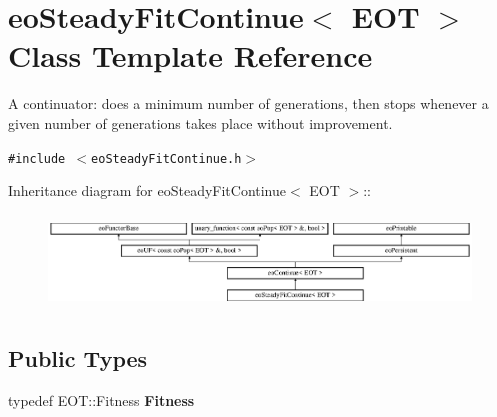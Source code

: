 \section{eo\-Steady\-Fit\-Continue$<$ EOT $>$ Class Template Reference}
\label{classeo_steady_fit_continue}
A continuator: does a minimum number of generations, then stops whenever a given number of generations takes place without improvement.  


{\tt \#include $<$eo\-Steady\-Fit\-Continue.h$>$}

Inheritance diagram for eo\-Steady\-Fit\-Continue$<$ EOT $>$::\begin{figure}[H]
\begin{center}
\leavevmode
\includegraphics[height=2.52252cm]{classeo_steady_fit_continue}
\end{center}
\end{figure}
\subsection*{Public Types}
\begin{CompactItemize}
\item 
typedef EOT::Fitness {\bf Fitness}\label{classeo_steady_fit_continue_w0}

\end{CompactItemize}
